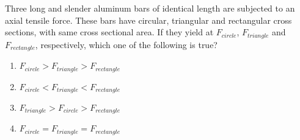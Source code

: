 	\item
	Three long and slender aluminum bars of identical length are subjected to an axial tensile force. These bars have circular, triangular and rectangular cross sections, with same cross sectional area. If they yield at $F_{circle}$, $F_{triangle}$ and $F_{rectangle}$, respectively, which one of the following is true?
		\begin{enumerate}
			\item $F_{circle} > F_{triangle} > F_{rectangle}$
			\item $F_{circle} < F_{triangle} < F_{rectangle}$
			\item $F_{triangle} > F_{circle} > F_{rectangle}$
			\item $F_{circle} = F_{triangle} = F_{rectangle}$
		\end{enumerate}
